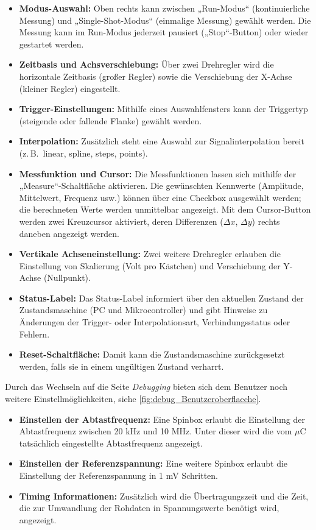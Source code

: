 \documentclass[a4paper, portrait, 12pt]{scrartcl} %
\begin{document}
\begin{itemize}
  \item \textbf{Modus-Auswahl:} Oben rechts kann zwischen „Run-Modus“ (kontinuierliche Messung) und „Single-Shot-Modus“ (einmalige Messung) gewählt werden. Die Messung kann im Run-Modus jederzeit pausiert („Stop“-Button) oder wieder gestartet werden.
  \item \textbf{Zeitbasis und Achsverschiebung:} Über zwei Drehregler wird die horizontale Zeitbasis (großer Regler) sowie die Verschiebung der X-Achse (kleiner Regler) eingestellt.
  \item \textbf{Trigger-Einstellungen:} Mithilfe eines Auswahlfensters kann der Triggertyp (steigende oder fallende Flanke) gewählt werden.
  \item \textbf{Interpolation:} Zusätzlich steht eine Auswahl zur Signalinterpolation bereit (z.\,B.\ linear, spline, steps, points).
  \item \textbf{Messfunktion und Cursor:} Die Messfunktionen lassen sich mithilfe der „Measure“-Schaltfläche aktivieren. Die gewünschten Kennwerte (Amplitude, Mittelwert, Frequenz usw.) können über eine Checkbox ausgewählt werden; die berechneten Werte werden unmittelbar angezeigt. Mit dem Cursor-Button werden zwei Kreuzcursor aktiviert, deren Differenzen ($\Delta x$, $\Delta y$) rechts daneben angezeigt werden.
  \item \textbf{Vertikale Achseneinstellung:} Zwei weitere Drehregler erlauben die Einstellung von Skalierung (Volt pro Kästchen) und Verschiebung der Y-Achse (Nullpunkt).
  \item \textbf{Status-Label:} Das Status-Label informiert über den aktuellen Zustand der Zustandsmaschine (PC und Mikrocontroller) und gibt Hinweise zu Änderungen der Trigger- oder Interpolationsart, Verbindungsstatus oder Fehlern.
  \item \textbf{Reset-Schaltfläche:} Damit kann die Zustandsmaschine zurückgesetzt werden, falls sie in einem ungültigen Zustand verharrt.
\end{itemize}

Durch das Wechseln auf die Seite \emph{Debugging} bieten sich dem Benutzer noch weitere Einstellmöglichkeiten, siehe \autoref{fig:debug_Benutzeroberflaeche}.

\begin{itemize}
\item \textbf{Einstellen der Abtastfrequenz:} Eine Spinbox erlaubt die Einstellung der Abtastfrequenz zwischen 20 kHz und 10 MHz. Unter dieser wird die vom $\mu$C tatsächlich eingestellte Abtastfrequenz angezeigt.
\item \textbf{Einstellen der Referenzspannung:} Eine weitere Spinbox erlaubt die Einstellung der Referenzspannung in 1 mV Schritten.
\item \textbf{Timing Informationen:} Zusätzlich wird die Übertragungszeit und die Zeit, die zur Umwandlung der Rohdaten in Spannungswerte benötigt wird, angezeigt.
\end{itemize}
 
\end{document}
